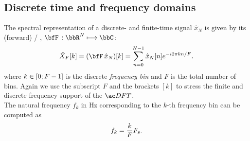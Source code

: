 \subsection{Discrete time and frequency domains}
The spectral representation of a discrete- and finite-time signal $\hat{x}_N$ is given by its (forward) \DFTdef/
,
$\discreteFT{}:\bbR^N\kmapsto\bbC$:
\begin{equation}\label{eq:processing:dft}
    \hat{X}_F[ k] = (\discreteFT{\hat{x}_N})[k] =
    \sum_{n = 0}^{N - 1}
    \hat{x}_N[ n]
    \cste^{-\csti2\pi k n / F}.
\end{equation}
where $k \in \kintervcc{0}{F - 1}$ is the discrete \textit{frequency bin} and $F$ is the total number of bins.
Again we use the subscript $F$ and the brackets $[k]$ to stress the finite and discrete frequency support of the $\DFT/$.
\\The natural frequency $f_k$ in $\si{\Hz}$ corresponding to the $k$-th frequency bin can be computed as
\begin{equation}\label{eq:processing:fk}
    f_k = \frac{k}{F}F_s
    .
\end{equation}

